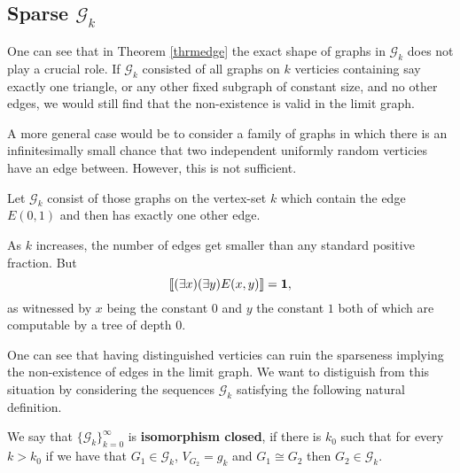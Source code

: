 \subsection{Sparse $\mathcal{G}_k$}

One can see that in Theorem \ref{thrmedge} the exact shape of graphs in $\mathcal{G}_k$ does not play a crucial role. If $\mathcal{G}_k$ consisted of all graphs on $k$ verticies containing say exactly one triangle, or any other fixed subgraph of constant size, and no other edges, we would still find that the non-existence is valid in the limit graph.

A more general case would be to consider a family of graphs in which there is an infinitesimally small chance that two independent uniformly random verticies have an edge between. However, this is not sufficient.

\begin{exam}
Let $\mathcal{G}_k$ consist of those graphs on the vertex-set $k$ which contain the edge $E(0,1)$ and then has exactly one other edge. 

As $k$ increases, the number of edges get smaller than any standard positive fraction. But
\[\llbracket(\exists x)(\exists y)E(x,y)\rrbracket=\textbf{1},\]
as witnessed by $x$ being the constant $0$ and $y$ the constant $1$ both of which are computable by a tree of depth $0$.
\end{exam}

One can see that having distinguished verticies can ruin the sparseness implying the non-existence of edges in the limit graph. We want to distiguish from this situation by considering the sequences $\mathcal{G}_k$ satisfying the following natural definition.

\begin{defi}
We say that $\{\mathcal{G}_k\}_{k=0}^\infty$ is \textbf{isomorphism closed}, if there is $k_0$ such that for every $k>k_0$ if we have that $G_1\in\mathcal{G}_k$, $V_{G_2}=g_k$ and $G_1\cong G_2$ then $G_2\in\mathcal{G}_k$.
\end{defi}


